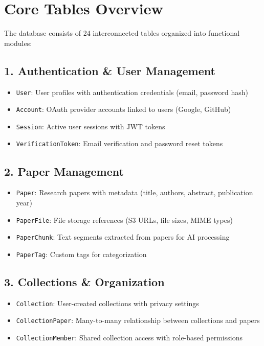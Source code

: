 \section{Core Tables Overview}
\label{sec:schema-tables-overview}

The database consists of 24 interconnected tables organized into functional modules:

\subsection{1. Authentication \& User Management}
\begin{itemize}[leftmargin=*,topsep=3pt,itemsep=2pt]
    \item \texttt{User}: User profiles with authentication credentials (email, password hash)
    \item \texttt{Account}: OAuth provider accounts linked to users (Google, GitHub)
    \item \texttt{Session}: Active user sessions with JWT tokens
    \item \texttt{VerificationToken}: Email verification and password reset tokens
\end{itemize}

\subsection{2. Paper Management}
\begin{itemize}[leftmargin=*,topsep=3pt,itemsep=2pt]
    \item \texttt{Paper}: Research papers with metadata (title, authors, abstract, publication year)
    \item \texttt{PaperFile}: File storage references (S3 URLs, file sizes, MIME types)
    \item \texttt{PaperChunk}: Text segments extracted from papers for AI processing
    \item \texttt{PaperTag}: Custom tags for categorization
\end{itemize}

\subsection{3. Collections \& Organization}
\begin{itemize}[leftmargin=*,topsep=3pt,itemsep=2pt]
    \item \texttt{Collection}: User-created collections with privacy settings
    \item \texttt{CollectionPaper}: Many-to-many relationship between collections and papers
    \item \texttt{CollectionMember}: Shared collection access with role-based permissions
\end{itemize}

